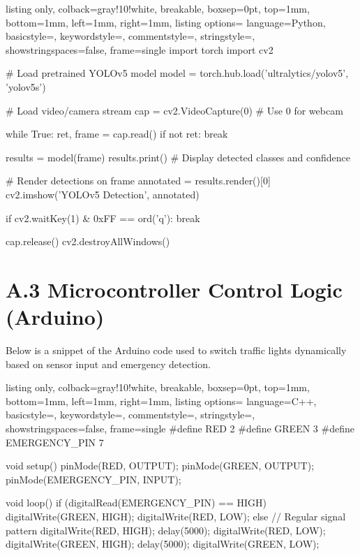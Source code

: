 \documentclass[12pt]{report}
\begin{document}
\begin{tcblisting}{listing only,
colback=gray!10!white,
breakable,
boxsep=0pt,
top=1mm,
bottom=1mm,
left=1mm,
right=1mm,
listing options={
language=Python,
basicstyle=\small\ttfamily,
keywordstyle=\color{blue},
commentstyle=\color{gray},
stringstyle=\color{teal},
showstringspaces=false,
frame=single
}}
import torch
import cv2

# Load pretrained YOLOv5 model
model = torch.hub.load('ultralytics/yolov5', 'yolov5s')

# Load video/camera stream
cap = cv2.VideoCapture(0)  # Use 0 for webcam

while True:
    ret, frame = cap.read()
    if not ret:
        break

    results = model(frame)
    results.print()  # Display detected classes and confidence

    # Render detections on frame
    annotated = results.render()[0]
    cv2.imshow('YOLOv5 Detection', annotated)

    if cv2.waitKey(1) & 0xFF == ord('q'):
        break

cap.release()
cv2.destroyAllWindows()
\end{tcblisting}

\section*{A.3 Microcontroller Control Logic (Arduino)}

Below is a snippet of the Arduino code used to switch traffic lights dynamically based on sensor input and emergency detection.

\begin{tcblisting}{listing only,
colback=gray!10!white,
breakable,
boxsep=0pt,
top=1mm,
bottom=1mm,
left=1mm,
right=1mm,
listing options={
language=C++,
basicstyle=\small\ttfamily,
keywordstyle=\color{blue},
commentstyle=\color{gray},
stringstyle=\color{orange},
showstringspaces=false,
frame=single
}}
#define RED 2
#define GREEN 3
#define EMERGENCY_PIN 7

void setup() {
  pinMode(RED, OUTPUT);
  pinMode(GREEN, OUTPUT);
  pinMode(EMERGENCY_PIN, INPUT);
}

void loop() {
  if (digitalRead(EMERGENCY_PIN) == HIGH) {
    digitalWrite(GREEN, HIGH);
    digitalWrite(RED, LOW);
  } else {
    // Regular signal pattern
    digitalWrite(RED, HIGH);
    delay(5000);
    digitalWrite(RED, LOW);
    digitalWrite(GREEN, HIGH);
    delay(5000);
    digitalWrite(GREEN, LOW);
  }
}
\end{tcblisting}
\end{document}
